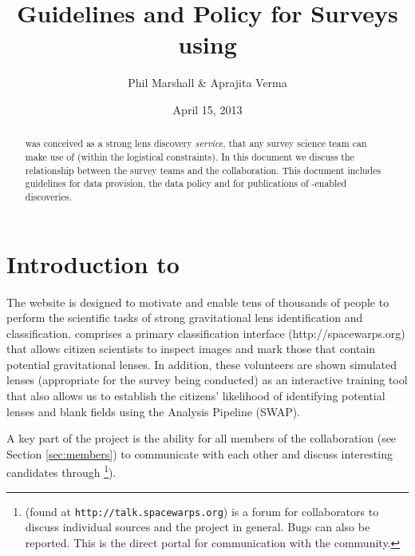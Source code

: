 \documentclass[a4paper]{article}
\begin{document}
             
\title{Guidelines and Policy for Surveys using \SW}
\author{Phil Marshall \& Aprajita Verma}
\date{April 15, 2013}
\maketitle


\begin{abstract} 
\noindent \sw was conceived as a strong lens
discovery {\it service}, that any survey science team can make use of
(within the logistical constraints). In this document we discuss the relationship
between the survey teams and the \sw collaboration. 
This document includes guidelines for data provision, the data policy and for publications of \sw-enabled discoveries.
\end{abstract}

\setcounter{footnote}{0}


\section{Introduction to \sw}

The \sw website is designed to motivate and  enable tens of thousands of
people to perform the scientific tasks of strong gravitational lens
identification and classification.  \sw comprises a primary classification interface (http://spacewarps.org) that allows citizen scientists to inspect images and mark those that contain potential gravitational lenses. In addition, these volunteers are shown simulated lenses (appropriate for the survey being conducted) as an interactive training tool that also allows us to establish the citizens' likelihood of identifying potential lenses and blank fields using the \sw Analysis Pipeline (SWAP). 

A key part of the \sw project is the ability for all members of the \sw collaboration (see Section \ref{sec:members}) to communicate with each other and discuss interesting candidates through \Talk\footnote{\Talk (found at \texttt{http://talk.spacewarps.org}) is a forum for \sw collaborators to discuss individual sources and the \sw project in general. Bugs can also be reported. This is the direct portal for communication with the \sw community.}).
\end{document}
